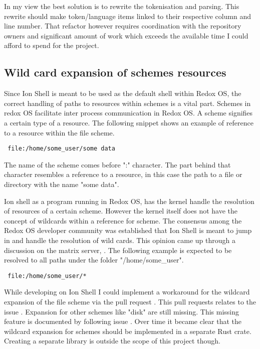 
In my view the best solution is to rewrite the tokenisation and parsing.
This rewrite should make token/language items linked to their respective column and line number.
That refactor however requires coordination with the repository owners and significant amount of work
which exceeds the available time I could afford to spend for the project.

\subsection{Wild card expansion of schemes resources}

Since Ion Shell is meant to be used as the default shell within Redox OS,
the correct handling of paths to resources within schemes is a vital part.
Schemes in redox OS facilitate inter process communication in Redox OS.
A scheme signifies a certain type of a resource.
The following snippet shows an example of reference to a resource within the file scheme.
\begin{verbatim}
 file:/home/some_user/some data
\end{verbatim}
The name of the scheme comes before ":" character.
The part behind that character resembles a reference to a resource,
in this case the path to a file or directory with the name "some data".

Ion shell as a program running in Redox OS, has the kernel
handle the resolution of resources of a certain scheme.
However the kernel itself does not have the concept of wildcards within a reference for scheme.
The consensus among the Redox OS developer community was established
that Ion Shell is meant to jump in and handle the resolution of wild cards.
This opinion came up through a discussion on the matrix server, \cite{matrix_channel}.
The following example is expected to be resolved to all paths under the folder "/home/some\_user".
\begin{verbatim}
 file:/home/some_user/*
\end{verbatim}

While developing on Ion Shell I could implement a workaround for the wildcard expansion of the file scheme
via the pull request \cite{pr_file_scheme} .
This pull requests relates to the issue \cite{issue_file_scheme}.
Expansion for other schemes like "disk" are still missing.
This missing feature is documented by following issue \cite{issue_disk_scheme}.
Over time it became clear that the wildcard expansion for schemes
should be implemented in a separate Rust crate.
Creating a separate library is outside the scope of this project though.

